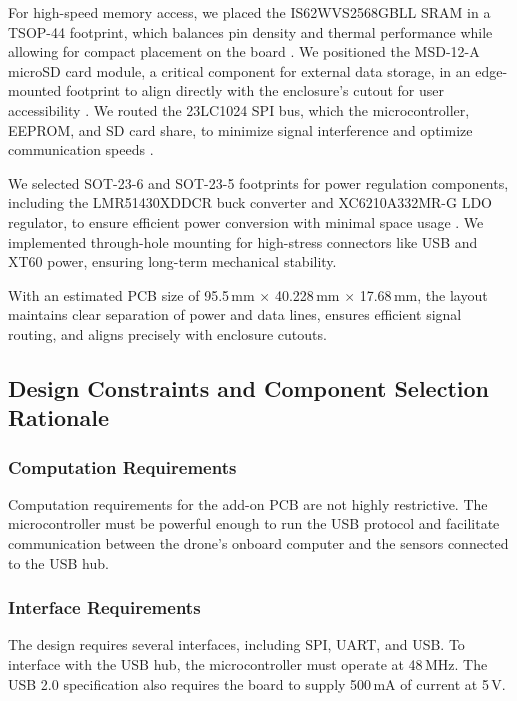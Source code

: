 \documentclass[12pt]{article}
\begin{document}
\par For high-speed memory access, we placed the IS62WVS2568GBLL SRAM in a TSOP-44 footprint, which balances pin density and thermal performance while allowing for compact placement on the board \cite{issi2023sram}. We positioned the MSD-12-A microSD card module, a critical component for external data storage, in an edge-mounted footprint to align directly with the enclosure’s cutout for user accessibility \cite{samesky2023msd}. We routed the 23LC1024 SPI bus, which the microcontroller, EEPROM, and SD card share, to minimize signal interference and optimize communication speeds \cite{microchip2023sram}.

\par We selected SOT-23-6 and SOT-23-5 footprints for power regulation components, including the LMR51430XDDCR buck converter and XC6210A332MR-G LDO regulator, to ensure efficient power conversion with minimal space usage \cite{ti2023stepdown} \cite{torex2023ldo}. We implemented through-hole mounting for high-stress connectors like USB and XT60 power, ensuring long-term mechanical stability.

\par With an estimated PCB size of 95.5\,mm $\times$ 40.228\,mm $\times$ 17.68\,mm, the layout maintains clear separation of power and data lines, ensures efficient signal routing, and aligns precisely with enclosure cutouts.

\subsection{Design Constraints and Component Selection Rationale}

\subsubsection{Computation Requirements}

Computation requirements for the add-on PCB are not highly restrictive. The microcontroller must be powerful enough to run the USB protocol and facilitate communication between the drone’s onboard computer and the sensors connected to the USB hub.

\subsubsection{Interface Requirements}

\par The design requires several interfaces, including SPI, UART, and USB. To interface with the USB hub, the microcontroller must operate at 48\,MHz. The USB 2.0 specification also requires the board to supply 500\,mA of current at 5\,V.
\end{document}
